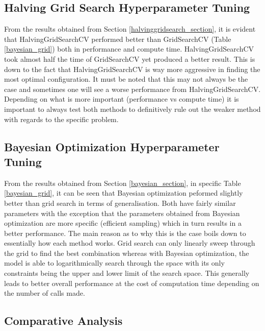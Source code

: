 \subsection{Halving Grid Search Hyperparameter Tuning}

From the results obtained from Section \ref{halvinggridsearch_section}, it is evident that HalvingGridSearchCV performed better than GridSearchCV (Table \ref{bayesian_grid}) both in performance
and compute time. HalvingGridSearchCV took almost half the time of GridSearchCV yet produced a better result. This is down to the fact that HalvingGridSearchCV is way more aggressive in finding
the most optimal configuration. It must be noted that this may not always be the case and sometimes one will see a worse performance from HalvingGridSearchCV. Depending on what is more important
(performance vs compute time) it is important to always test both methods to definitively rule out the weaker method with regards to the specific problem.

\subsection{Bayesian Optimization Hyperparameter Tuning}\label{bayesian_discussion}

From the results obtained from Section \ref{bayesian_section}, in specific Table \ref{bayesian_grid}, it can be seen that Bayesian optimization peformed slightly better than
grid search in terms of generalisation. Both have fairly similar parameters with the exception that the parameters obtained from Bayesian optimization are more specific (efficient sampling) 
which in turn results in a better performance. The main reason as to why this is the case boils down to essentially how each method works. Grid search can only linearly sweep through the grid 
to find the best combination whereas with Bayesian optimization, the model is able to logarithmically search through the space with its only constraints being the upper and lower limit of 
the search space. This generally leads to better overall performance at the cost of computation time depending on the number of calls made.

\subsection{Comparative Analysis}


